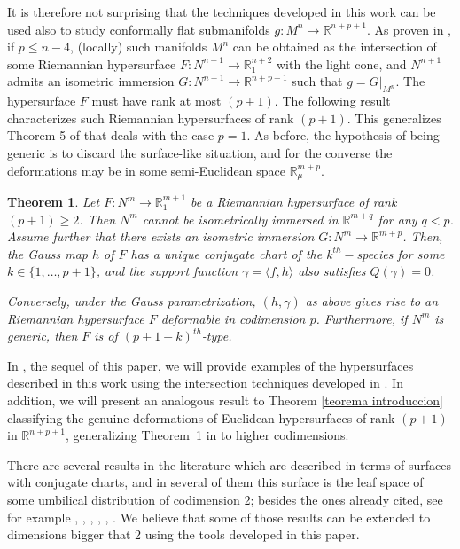 \documentclass{article}
\newtheorem{thm}{Theorem}[section]
\theoremstyle{remark}
\begin{document}
It is therefore not surprising that the techniques developed in this work can be used also to study conformally flat submanifolds $g:M^n\rightarrow\mathbb{R}^{n+p+1}$. 
As proven in \cite{DF2}, if $p\leq n-4$, (locally) such manifolds $M^n$ can be obtained as the intersection of some Riemannian hypersurface $F:N^{n+1}\rightarrow\mathbb{R}_1^{n+2}$ with the light cone, and $N^{n+1}$ admits an isometric immersion $G:N^{n+1}\rightarrow\mathbb{R}^{n+p+1}$ such that $g=G|_{M^n}$. 
The hypersurface $F$ must have rank at most $(p+1)$. 
The following result characterizes such Riemannian hypersurfaces of rank $(p+1)$. 
This generalizes Theorem 5 of \cite{DF2} that deals with the case $p=1$. 
As before, the hypothesis of being generic is to discard the surface-like situation, and for the converse the deformations may be in some semi-Euclidean space $\mathbb{R}^{m+p}_{\mu}$.

\begin{thm}\label{teorema de hipersuperficies lorentzianas}
    Let $F:N^{m}\rightarrow \mathbb{R}_1^{m+1}$ be a Riemannian hypersurface of rank $(p+1)\geq2$. Then $N^{m}$ cannot be isometrically immersed in $\mathbb{R}^{m+q}$ for any $q<p$. Assume further that there exists an isometric immersion $G:N^m\rightarrow\mathbb{R}^{m+p}$. Then, the Gauss map $h$ of $F$ has a unique conjugate chart of the $k^{th}-$species for some $k\in\{1,\ldots,p+1\}$, and the support function $\gamma=\langle f,h\rangle$ also satisfies $Q(\gamma)=0$.
    
    
    Conversely, under the Gauss parametrization, $(h,\gamma)$ as above gives rise to an Riemannian hypersurface $F$ deformable in codimension $p$. Furthermore, if $N^{m}$ is generic, then $F$ is of $(p+1-k)^{th}$-type.
\end{thm}

In \cite{YoGD2}, the sequel of this paper, we will provide examples of the hypersurfaces described in this work using the intersection techniques developed in \cite{DFT2}. In addition, we will present an analogous result to Theorem \ref{teorema introduccion} classifying the genuine deformations of Euclidean hypersurfaces of rank $(p+1)$ in $\mathbb{R}^{n+p+1}$, generalizing Theorem~1 in \cite{DFT} to higher codimensions. 

There are several results in the literature which are described in terms of surfaces with conjugate charts, and in several of them this surface is the leaf space of some umbilical distribution of codimension 2; besides the ones already cited, see for example \cite{CThiperConf2}, \cite{DJV}, \cite{DT2},  \cite{DV}, \cite{DV2}, \cite{DV3}. We believe that some of those results can be extended to dimensions bigger that 2 using the tools developed in this paper.
\end{document}
